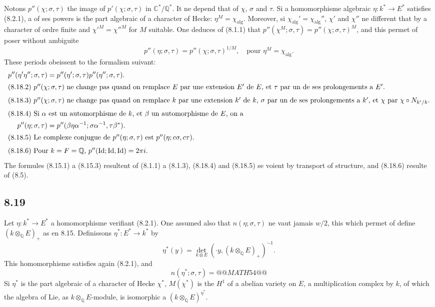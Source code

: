 \documentclass[12pt,a4paper]{article}
\theoremstyle{plain}
\theoremstyle{definition}
\theoremstyle{remark}
\newcommand{\Q}{\mathbb{Q}}
\newcommand{\C}{\mathbb{C}}
\begin{document}
Notons $p''(\chi; \sigma, \tau)$ the image of $p'(\chi; \sigma, \tau)$ in $\C^*/\Q^*$. It ne depend that
of $\chi$, $\sigma$ and $\tau$. Si a homomorphisme algebraic $\eta: k^* \to E^*$ satisfies (8.2.1),
a of ses powers is the part algebraic of a character of Hecke: $\eta^M = \chi_{\text{alg}}$.
Moreover, si $\chi_{\text{alg}}' = \chi_{\text{alg}}''$, $\chi'$ and $\chi''$ ne different that by a character of ordre
finite and $\chi'^M = \chi''^M$ for $M$ suitable. One deduces of (8.1.1) that
$p''(\chi^M; \sigma, \tau) = p''(\chi; \sigma, \tau)^M$, and this permet of poser without ambiguite
\[
p''(\eta; \sigma, \tau) = p''(\chi; \sigma, \tau)^{1/M}, \quad \text{pour } \eta^M = \chi_{\text{alg}}.
\]
These periods obeissent to the formalism suivant:
\begin{align}
p''(\eta' \eta''; \sigma, \tau) &= p''(\eta'; \sigma, \tau) p''(\eta''; \sigma, \tau). \\
\intertext{(8.18.2) $p''(\chi; \sigma, \tau)$ ne change pas quand on remplace $E$ par une extension
$E'$ de $E$, et $\tau$ par un de ses prolongements a $E'$.}
\intertext{(8.18.3) $p''(\chi; \sigma, \tau)$ ne change pas quand on remplace $k$ par une extension
$k'$ de $k$, $\sigma$ par un de ses prolongements a $k'$, et $\chi$ par $\chi \circ N_{k'/k}$.}
\intertext{(8.18.4) Si $\alpha$ est un automorphisme de $k$, et $\beta$ un automorphisme de $E$, on a}
p''(\eta; \sigma, \tau) &= p''(\beta \eta \alpha^{-1}; \sigma \alpha^{-1}, \tau \beta^*). \\
\intertext{(8.18.5) Le complexe conjugue de $p''(\eta; \sigma, \tau)$ est $p''(\eta; c\sigma, c\tau)$.}
\intertext{(8.18.6) Pour $k = F = \Q$, $p''(\text{Id}; \text{Id}, \text{Id}) = 2\pi i$.}
\end{align}
The formules (8.15.1) a (8.15.3) resultent of (8.1.1) a (8.1.3), (8.18.4) and (8.18.5)
se voient by transport of structure, and (8.18.6) resulte of (8.5).

\subsection*{8.19}

Let $\eta: k^* \to E^*$ a homomorphisme verifiant (8.2.1). One assumed also
that $n(\eta; \sigma, \tau)$ ne vaut jamais $w/2$, this which permet of define $(k \otimes_\Q E)_+$
as en 8.15. Definissons $\eta^*: E^* \to k^*$ by
\[
\eta^*(y) = \det_{k \otimes E}(\cdot y, (k \otimes_\Q E)_+)^{-1}.
\]
This homomorphisme satisfies again (8.2.1), and
\[
n(\eta^*; \sigma, \tau) =
@@MATH54@@
\]
Si $\eta^*$ is the part algebraic of a character of Hecke $\chi^*$, $M(\chi^*)$ is the $H^1$
of a abelian variety on $E$, a multiplication complex by $k$, of which the algebra of
Lie, as $k \otimes_\Q E$-module, is isomorphic a $(k \otimes_\Q E)^{\eta^*}$.
\end{document}
